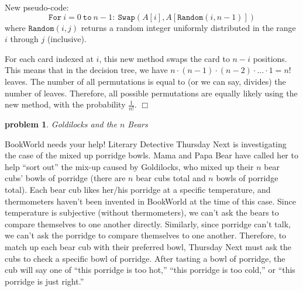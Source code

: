 \documentclass[10pt]{article}
\newenvironment{proof}{\par\noindent{\it Proof.}\hspace*{1em}}{$\Box$\bigskip}
\newtheorem{problem}{\sc\color{cit}problem}
\begin{document}
\begin{enumerate}
    New pseudo-code:
    \[ \mathtt{For} \ i = 0 \ \mathtt{to} \ n-1: \ \mathtt{Swap}(A[i], A[\mathtt{Random}(i,n-1)]) \]
    where $\mathtt{Random}(i,j)$ returns a random integer uniformly distributed in the range $i$ through $j$ (inclusive).
    \begin{proof}
    For each card indexed at $i$, this new method swaps the card to $n-i$ positions. This means that in the decision tree, we have $n\cdot(n-1)\cdot(n-2)\cdot...\cdot1=n!$ leaves. The number of all permutations is equal to (or we can say, divides) the number of leaves. Therefore, all possible permutations are equally likely using the new method, with the probability $\frac{1}{n!}$. 
    \end{proof}
\end{enumerate}

\vspace*{.25in} %
\begin{problem} Goldilocks and the $n$ Bears \end{problem}
    \noindent BookWorld needs your help! Literary Detective Thursday Next is investigating the case of the mixed up porridge bowls.  Mama and Papa Bear have called her to help ``sort out'' the mix-up caused by Goldilocks, who mixed up their $n$ bear cubs' bowls of porridge (there are $n$ bear cubs total and $n$ bowls of porridge total).  Each bear cub likes her/his porridge at a specific temperature, and thermometers haven't been invented in BookWorld at the time of this case.  Since temperature is subjective (without thermometers), we can't ask the bears to compare themselves to one another directly.  Similarly, since porridge can't talk, we can't ask the porridge to compare themselves to one another.  Therefore, to match up each bear cub with their preferred bowl, Thursday Next must ask the cubs to check a specific bowl of porridge.  After tasting a bowl of porridge, the cub will say one of ``this porridge is too hot,'' ``this porridge is too cold,'' or ``this porridge is just right.'' 
\end{document}
